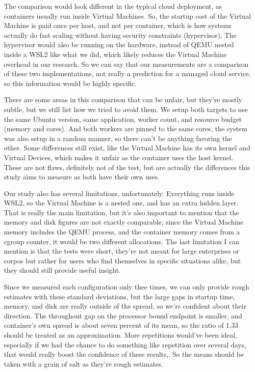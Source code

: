 \documentclass[conference,a4paper]{IEEEtran}
\begin{document}
The comparison would look different in the typical cloud deployment, as containers usually run inside Virtual Machines. So, the startup cost of the Virtual Machine is paid once per host, and not per container, which is how systems actually do fast scaling without having security constraints (hypervisor). The hypervisor would also be running on the hardware, instead of QEMU nested inside a WSL2 like what we did, which likely reduces the Virtual Machine overhead in our research. So we can say that our measurements are a comparison of these two implementations, not really a prediction for a managed cloud service, so this information would be highly specific.

There are some areas in this comparison that can be unfair, but they’re mostly subtle, but we still list how we tried to avoid them. We setup both targets to use the same Ubuntu version, same application, worker count, and resource budget (memory and cores). And both workers are pinned to the same cores, the system was also setup in a random manner, so there can’t be anything favoring the other. Some differences still exist, like the Virtual Machine has its own kernel and Virtual Devices, which makes it unfair as the container uses the host kernel. These are not flaws, definitely not of the test, but are actually the differences this study aims to measure as both have their own uses.

Our study also has several limitations, unfortunately. Everything runs inside WSL2, so the Virtual Machine is a nested one, and has an extra hidden layer. That is really the main limitation, but it’s also important to mention that the memory and disk figures are not exactly comparable, since the Virtual Machine memory includes the QEMU process, and the container memory comes from a cgroup counter, it would be two different allocations. The last limitation I can mention is that the tests were short, they’re not meant for large enterprises or corpos but rather for users who find themselves in specific situations alike, but they should still provide useful insight.

Since we measured each configuration only thee times, we can only provide rough estimates with these standard deviations, but the large gaps in startup time, memory, and disk are really outside of the spread, so we’re confident about their direction. The throughout gap on the processor bound endpoint is smaller, and container’s own spread is about seven percent of its mean, so the ratio of 1.33 should be treated as an approximation. More repetitions would’ve been ideal, especially if we had the chance to do something like repetition over several days, that would really boost the confidence of these results,. So the means should be taken with a grain of salt as they’re rough estimates.
\end{document}
